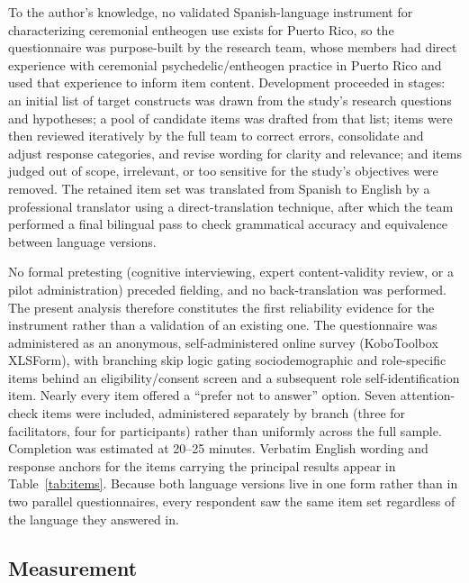 \documentclass[12pt]{article}
\begin{document}
To the author's knowledge, no validated Spanish-language instrument for characterizing ceremonial entheogen
use exists for Puerto Rico, so the questionnaire was purpose-built by the research team, whose members had
direct experience with ceremonial psychedelic/entheogen practice in Puerto Rico and used that experience to
inform item content. Development proceeded in stages: an initial list of target constructs was drawn from
the study's research questions and hypotheses; a pool of candidate items was drafted from that list; items
were then reviewed iteratively by the full team to correct errors, consolidate and adjust response
categories, and revise wording for clarity and relevance; and items judged out of scope, irrelevant, or too
sensitive for the study's objectives were removed. The retained item set was translated from Spanish to
English by a professional translator using a direct-translation technique, after which the team performed a
final bilingual pass to check grammatical accuracy and equivalence between language versions.

No formal pretesting (cognitive interviewing, expert content-validity review, or a pilot administration)
preceded fielding, and no back-translation was performed. The present analysis therefore constitutes the
first reliability evidence for the instrument rather than a validation of an existing one. The questionnaire
was administered as an anonymous, self-administered online survey (KoboToolbox XLSForm), with branching skip
logic gating sociodemographic and role-specific items behind an eligibility/consent screen and a subsequent
role self-identification item. Nearly every item offered a ``prefer not to answer'' option. Seven
attention-check items were included, administered separately by branch (three for facilitators, four for
participants) rather than uniformly across the full sample. Completion was estimated at 20--25 minutes.
Verbatim English wording and response anchors for the items carrying the principal results appear in
Table~\ref{tab:items}. Because both language versions live in one form rather than in two parallel
questionnaires, every respondent saw the same item set regardless of the language they answered in.

\subsection{Measurement}
\end{document}
